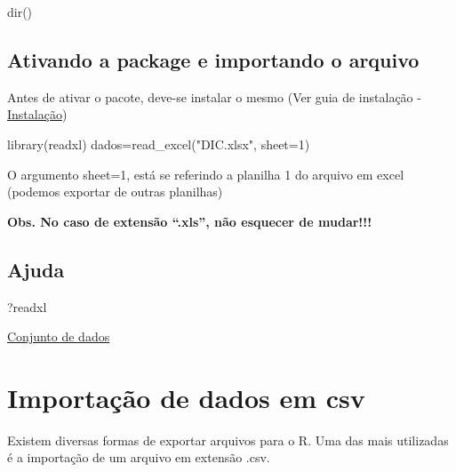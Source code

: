 \documentclass[
]{book}
\newenvironment{Shaded}{\begin{snugshade}}{\end{snugshade}}
\newcommand{\AttributeTok}[1]{\textcolor[rgb]{0.77,0.63,0.00}{#1}}
\newcommand{\DecValTok}[1]{\textcolor[rgb]{0.00,0.00,0.81}{#1}}
\newcommand{\FunctionTok}[1]{\textcolor[rgb]{0.00,0.00,0.00}{#1}}
\newcommand{\NormalTok}[1]{#1}
\newcommand{\OtherTok}[1]{\textcolor[rgb]{0.56,0.35,0.01}{#1}}
\newcommand{\StringTok}[1]{\textcolor[rgb]{0.31,0.60,0.02}{#1}}
\begin{document}
\begin{Shaded}
\begin{Highlighting}[]
\FunctionTok{dir}\NormalTok{()}
\end{Highlighting}
\end{Shaded}

\hypertarget{ativando-a-package-e-importando-o-arquivo}{%
\subsection{Ativando a package e importando o arquivo}\label{ativando-a-package-e-importando-o-arquivo}}

Antes de ativar o pacote, deve-se instalar o mesmo (Ver guia de instalação - \href{https://agronomiar.000webhostapp.com/manual_instalacao.pdf}{Instalação})

\begin{Shaded}
\begin{Highlighting}[]
\FunctionTok{library}\NormalTok{(readxl)}
\NormalTok{dados}\OtherTok{=}\FunctionTok{read\_excel}\NormalTok{(}\StringTok{"DIC.xlsx"}\NormalTok{, }\AttributeTok{sheet=}\DecValTok{1}\NormalTok{)}
\end{Highlighting}
\end{Shaded}

O argumento sheet=1, está se referindo a planilha 1 do arquivo em excel (podemos exportar de outras planilhas)

\textbf{Obs. No caso de extensão ``.xls'', não esquecer de mudar!!!}

\hypertarget{ajuda}{%
\subsection{Ajuda}\label{ajuda}}

\begin{Shaded}
\begin{Highlighting}[]
\NormalTok{?readxl}
\end{Highlighting}
\end{Shaded}

\href{https://agronomiar.000webhostapp.com/DIC.xlsx}{Conjunto de dados}

\hypertarget{importauxe7uxe3o-de-dados-em-csv}{%
\section{Importação de dados em csv}\label{importauxe7uxe3o-de-dados-em-csv}}

Existem diversas formas de exportar arquivos para o R. Uma das mais utilizadas é a importação de um arquivo em extensão .csv.
\end{document}
